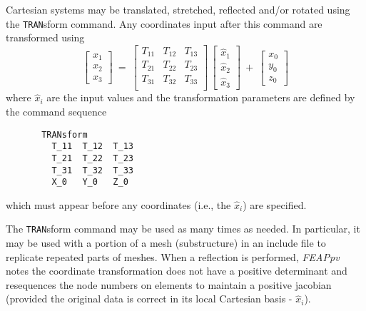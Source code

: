 Cartesian systems may be translated, stretched, reflected and/or rotated using
the {\tt TRAN}\-sform command.
Any coordinates input after this command are transformed using
$$\left[
\begin{matrix} x_1 \\ x_2 \\ x_3 \end{matrix} \right] ~=~
\left[
\begin{matrix}
T_{11} & T_{12} & T_{13} \\
T_{21} & T_{22} & T_{23} \\
T_{31} & T_{32} & T_{33} \\
\end{matrix} \right] \,
\left[
\begin{matrix} \hat x_1 \\ \hat x_2 \\ \hat x_3
\end{matrix} \right] ~+~
\left[
\begin{matrix} x_0 \\ y_0 \\ z_0
\end{matrix} \right]$$
where $\hat x_i$ are the input values and the transformation parameters are
defined by the command sequence
\begin{verbatim}
       TRANsform
         T_11  T_12  T_13
         T_21  T_22  T_23
         T_31  T_32  T_33
         X_0   Y_0   Z_0
\end{verbatim}
which must appear before any coordinates (i.e., the $\hat x_i$) are specified.

The {\tt TRAN}sform command may be used as many times as needed.  In particular,
it may be used with a portion of a mesh (substructure) in an include file
to replicate repeated parts of meshes.  When a reflection is performed,
{\sl FEAPpv} notes the coordinate transformation does not have a positive
determinant and resequences the node numbers on elements to maintain
a positive jacobian (provided the original data is correct in its local
Cartesian basis - $\hat{x}_i$).
